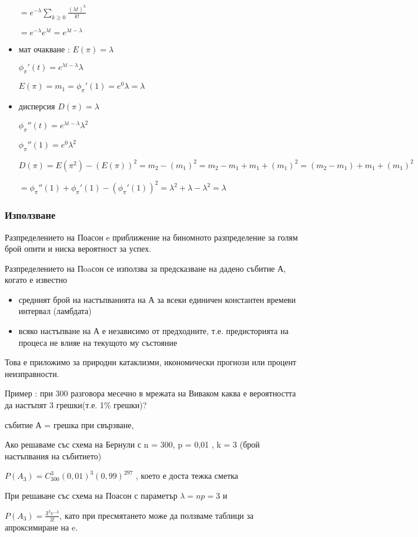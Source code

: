 \documentclass[fleqn,12pt]{article}
\begin{document}
\begin{justify}
\begin{itemize}
    $= e^{-\lambda} \sum_{k \geq 0} \frac{(\lambda t)^k}{k!}$

    $= e^{-\lambda} e^{\lambda t} = e^{\lambda t - \lambda}$
    \item мат очакване : $E(\pi) = \lambda$
    
    $\phi_\pi'(t) = e^{\lambda t - \lambda} \lambda$ 
    
    $E(\pi) = m_1 = \phi_\pi'(1) = e^0 \lambda = \lambda$
    
    \item дисперсия $D(\pi) = \lambda$
    
    $\phi_\pi''(t) = e^{\lambda t - \lambda} \lambda^2$ 
    
    $\phi_\pi''(1) = e^0 \lambda^2$

    $D(\pi) = E(\pi^2) - (E(\pi))^2 = m_2 - (m_1)^2 = m_2 - m_1 + m_1 + (m_1)^2 = (m_2 - m_1) + m_1 + (m_1)^2$

    $= \phi_\pi''(1) + \phi_\pi'(1) - (\phi_\pi'(1))^2 = \lambda^2 + \lambda - \lambda^2 = \lambda$
\end{itemize}

\subsubsection{Използване} 
Разпределението на Поасон e приближение на биномното разпределение за голям брой опити и ниска вероятност за успех.

Разпределението на Пoaсон се използва за предсказване на дадено събитие А, когато е известно
\begin{itemize}
    \item средният брой на настъпванията на А за всеки единичен константен времеви интервал (ламбдата)
    \item всяко настъпване на А е независимо от предходните, т.е. предисторията на процеса не влияе на текущото му 
    състояние
\end{itemize}

Това е приложимо за природни катаклизми, икономически прогнози или процент неизправности.

Пример : при 300 разговора месечно в мрежата на Виваком каква е вероятността да настъпят 3 грешки(т.е. 1\% грешки)?

събитие А = {грешка при свързване}, 

Ако решаваме със схема на Бернули с n = 300, p = 0,01 , k = 3 (брой настъпвания на събитието)

$P(A_3) = C_{300}^3 (0,01) ^ 3 (0,99)^{297}$ , което е доста тежка сметка

При решаване със схема на Поасон с параметър $\lambda = np = 3$ и 

$P(A_3) = \frac{3^3 e^{-3}}{3!}$, като при пресмятането може да ползваме таблици за апроксимиране на e.
\end{justify}
\end{document}

